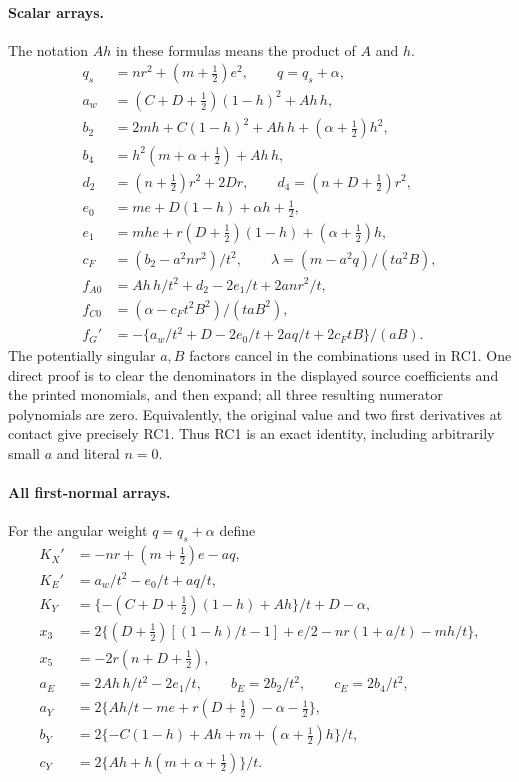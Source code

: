 \paragraph{Scalar arrays.}
The notation $Ah$ in these formulas means the product of $A$ and $h$.
\[
\begin{aligned}
q_s&=nr^2+(m+\tfrac12)e^2,\qquad q=q_s+\alpha,\\
a_w&=(C+D+\tfrac12)(1-h)^2+Ah\,h,\\
b_2&=2mh+C(1-h)^2+Ah\,h+(\alpha+\tfrac12)h^2,\\
b_4&=h^2(m+\alpha+\tfrac12)+Ah\,h,\\
d_2&=(n+\tfrac12)r^2+2Dr,\qquad
d_4=(n+D+\tfrac12)r^2,\\
e_0&=me+D(1-h)+\alpha h+\tfrac12,\\
e_1&=mhe+r(D+\tfrac12)(1-h)+(\alpha+\tfrac12)h,\\
c_F&=(b_2-a^2nr^2)/t^2,\qquad
\lambda=(m-a^2q)/(ta^2B),\\
f_{A0}&=Ah\,h/t^2+d_2-2e_1/t+2anr^2/t,\\
f_{C0}&=(\alpha-c_Ft^2B^2)/(taB^2),\\
f_G'&=-\{a_w/t^2+D-2e_0/t+2aq/t+2c_FtB\}/(aB).
\end{aligned}
\]
The potentially singular $a,B$ factors cancel in the combinations
used in RC1. One direct proof is to clear the denominators in the displayed source
coefficients and the printed monomials, and then expand; all three resulting numerator polynomials are
zero. Equivalently, the original value and two first derivatives at
contact give precisely RC1. Thus RC1 is an exact identity, including
arbitrarily small $a$ and literal $n=0$.

\paragraph{All first-normal arrays.}
For the angular weight $q=q_s+\alpha$ define
\[
\begin{aligned}
K_X'&=-nr+(m+\tfrac12)e-aq,\\
K_E'&=a_w/t^2-e_0/t+aq/t,\\
K_Y&=\{-(C+D+\tfrac12)(1-h)+Ah\}/t+D-\alpha,\\
x_3&=2\{(D+\tfrac12)[(1-h)/t-1]+e/2-nr(1+a/t)-mh/t\},\\
x_5&=-2r(n+D+\tfrac12),\\
a_E&=2Ah\,h/t^2-2e_1/t,\qquad b_E=2b_2/t^2,\qquad c_E=2b_4/t^2,\\
a_Y&=2\{Ah/t-me+r(D+\tfrac12)-\alpha-\tfrac12\},\\
b_Y&=2\{-C(1-h)+Ah+m+(\alpha+\tfrac12)h\}/t,\\
c_Y&=2\{Ah+h(m+\alpha+\tfrac12)\}/t.
\end{aligned}
\]
